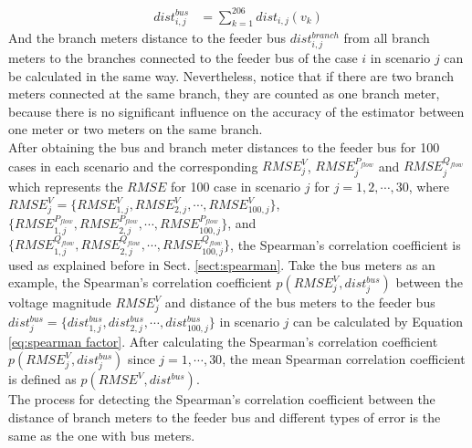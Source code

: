 \begin{align}
    dist^{bus}_{i,j} &= \sum_{k=1}^{206} dist_{i,j}(v_k)
    \label{eq:dist_bus}
\end{align}
And the branch meters distance to the feeder bus $dist^{branch}_{i,j}$ from all branch meters to the branches connected to the feeder bus of the case $i$ in scenario $j$ can be calculated in the same way. Nevertheless, notice that if there are two branch meters connected at the same branch, they are counted as one branch meter, because there is no significant influence on the accuracy of the estimator between one meter or two meters on the same branch.
\bigskip
\\After obtaining the bus and branch meter distances to the feeder bus for 100 cases in each scenario and the corresponding $RMSE_j^V$, $RMSE_j^{P_{flow}}$ and $RMSE_j^{Q_{flow}}$ which represents the $RMSE$ for 100 case in scenario $j$ for $j=1,2,\cdots,30$, where $RMSE_j^V=\{RMSE_{1,j}^V,RMSE_{2,j}^V,\cdots,RMSE_{100,j}^V \}$, $\{RMSE_{1,j}^{P_{flow}},RMSE_{2,j}^{P_{flow}},\cdots,RMSE_{100,j}^{P_{flow}} \}$, and $\{RMSE_{1,j}^{Q_{flow}},RMSE_{2,j}^{Q_{flow}},\cdots,RMSE_{100,j}^{Q_{flow}} \}$, the Spearman's correlation coefficient is used as explained before in Sect. \ref{sect:spearman}. Take the bus meters as an example, the Spearman's correlation coefficient $p(RMSE_j^V,dist_j^{bus})$ between the voltage magnitude $RMSE_j^V$ and distance of the bus meters to the feeder bus $dist_j^{bus}=\{dist_{1,j}^{bus},dist_{2,j}^{bus},\cdots,dist_{100,j}^{bus} \}$ in scenario $j$ can be calculated by Equation \ref{eq:spearman factor}. After calculating the Spearman's correlation coefficient $p(RMSE_j^V,dist_j^{bus})$ since $j=1,\cdots,30$, the mean Spearman correlation coefficient is defined as $p(RMSE^V,dist^{bus})$.
\bigskip
\\The process for detecting the Spearman's correlation coefficient between the distance of branch meters to the feeder bus and different types of error is the same as the one with bus meters. 
    
